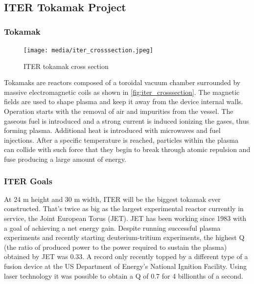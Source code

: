 \subsection{ITER Tokamak Project}
  \subsubsection{Tokamak}
	\begin{figure}[H]
	  \centering
	  \texttt{[image: media/iter\_crosssection.jpeg]}
	  \caption{ITER tokamak cross section\cite{iter_website}}
	  \label{fig:iter_crosssection}
	\end{figure}
	Tokamaks are reactors composed of a toroidal vacuum chamber surrounded by
	massive electromagnetic coils as shown in \autoref{fig:iter_crosssection}.
	The magnetic fields are used to shape plasma 
	and keep it away from the device internal walls. 
	Operation starts with the removal of air and impurities from the vessel.
	The gaseous fuel is introduced and a strong current is induced 
	ionizing the gases, thus forming plasma. Additional heat is introduced with
	microwaves and fuel injections. After a specific temperature is reached, 
	particles within the plasma can collide with such force that they begin
	to break through atomic repulsion and fuse producing a large amount of energy.
	\cite{iter_website}
  \subsubsection{ITER Goals}

	At 24 m height and 30 m width, 
	ITER will be the biggest tokamak ever constructed. 
	That's twice as big as the largest experimental reactor currently in service, 
	the Joint European Torus (JET). JET has been working since 1983 with 
	a goal of achieving a net energy gain. Despite running successful 
	plasma experiments and recently starting deuterium-tritium experiments,
	the highest Q 
	(the ratio of produced power to the power required to sustain the plasma)
	obtained by JET was 0.33. A record only recently topped by a different 
	type of a fusion device at the US Department of Energy’s
	National Ignition Facility. Using laser technology it was possible to
	obtain a Q of 0.7 for 4 billionths of a second. \cite{fusion_records}
	

